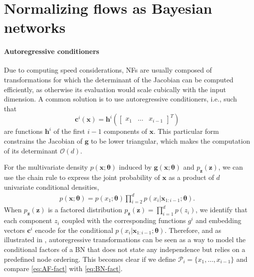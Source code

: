 \section{Normalizing flows as Bayesian networks} \label{sec:NF-BN}


\paragraph{Autoregressive conditioners}
Due to computing speed considerations, NFs are usually composed of transformations for which the determinant of the Jacobian can be computed efficiently, as otherwise its evaluation would scale cubically with the input dimension.
A common solution is to use autoregressive conditioners, i.e., such that
$$\mathbf{c}^i(\mathbf{x}) = \mathbf{h}^i\left(\begin{bmatrix} x_1 & \hdots & x_{i-1} \end{bmatrix}^T\right)$$ are functions $\mathbf{h}^i$ of the first $i-1$ components of $\mathbf{x}$. This particular form constrains the Jacobian of $\mathbf{g}$ to be lower triangular, which makes the computation of its determinant $\mathcal{O}(d)$.

For the multivariate density $p(\mathbf{x}; \mathbf{\theta})$ induced by $\mathbf{g}(\mathbf{x};\mathbf{\theta})$ and $p_{\mathbf{z}}(\mathbf{z})$, we can use the chain rule to express the joint probability of $\mathbf{x}$ as a product of $d$ univariate conditional densities,
\begin{align}
    p(\mathbf{x}; \mathbf{\theta}) = p(x_1; \mathbf{\theta})\prod^{d}_{i=2}p(x_{i}|\mathbf{x}_{1:i-1}; \mathbf{\theta}). \label{eq:AF-fact}
\end{align}
When $p_{\mathbf{z}}(\mathbf{z})$ is a factored distribution $p_{\mathbf{z}}(\mathbf{z}) = \prod^{d}_{i=1}p(z_i)$, we identify that each component $z_i$ coupled with the corresponding functions $g^i$ and embedding vectors $\mathbf{c}^i$ encode for the conditional $p(x_{i}|\mathbf{x}_{1:i-1}; \mathbf{\theta})$. Therefore, and as illustrated in , autoregressive transformations can be seen as a way to model the conditional factors of a BN that does not state any independence but relies on a predefined node ordering. This becomes clear if we define $\mathcal{P}_i = \{x_1, \hdots, x_{i-1}\}$ and compare \eqref{eq:AF-fact} with \eqref{eq:BN-fact}.

